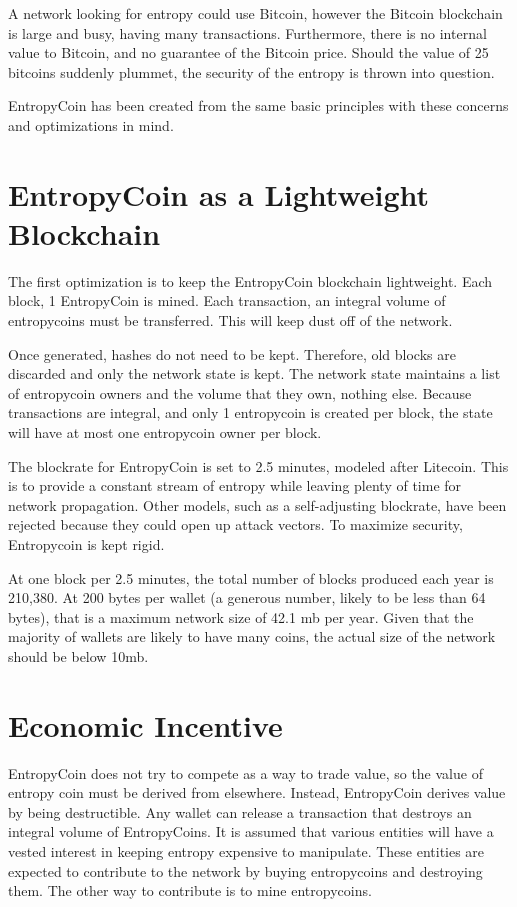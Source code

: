 \documentclass[twocolumn]{article}
\begin{document}
A network looking for entropy could use Bitcoin, however the Bitcoin blockchain is large and busy, having many transactions.
Furthermore, there is no internal value to Bitcoin, and no guarantee of the Bitcoin price.
Should the value of 25 bitcoins suddenly plummet, the security of the entropy is thrown into question.

EntropyCoin has been created from the same basic principles with these concerns and optimizations in mind.

\section{EntropyCoin as a Lightweight Blockchain}
The first optimization is to keep the EntropyCoin blockchain lightweight.
Each block, 1 EntropyCoin is mined.
Each transaction, an integral volume of entropycoins must be transferred.
This will keep dust off of the network.

Once generated, hashes do not need to be kept.
Therefore, old blocks are discarded and only the network state is kept.
The network state maintains a list of entropycoin owners and the volume that they own, nothing else.
Because transactions are integral, and only 1 entropycoin is created per block, the state will have at most one entropycoin owner per block.

The blockrate for EntropyCoin is set to 2.5 minutes, modeled after Litecoin.
This is to provide a constant stream of entropy while leaving plenty of time for network propagation.
Other models, such as a self-adjusting blockrate, have been rejected because they could open up attack vectors.
To maximize security, Entropycoin is kept rigid.

At one block per 2.5 minutes, the total number of blocks produced each year is 210,380.
At 200 bytes per wallet (a generous number, likely to be less than 64 bytes), that is a maximum network size of 42.1 mb per year.
Given that the majority of wallets are likely to have many coins, the actual size of the network should be below 10mb.

\section{Economic Incentive}
EntropyCoin does not try to compete as a way to trade value, so the value of entropy coin must be derived from elsewhere.
Instead, EntropyCoin derives value by being destructible.
Any wallet can release a transaction that destroys an integral volume of EntropyCoins.
It is assumed that various entities will have a vested interest in keeping entropy expensive to manipulate.
These entities are expected to contribute to the network by buying entropycoins and destroying them.
The other way to contribute is to mine entropycoins.
\end{document}

